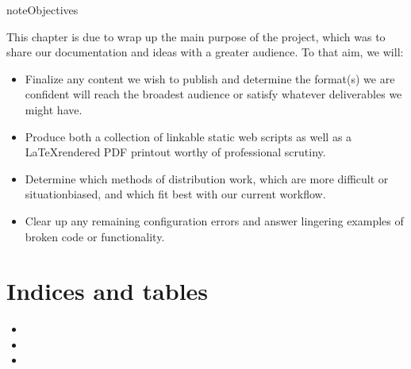 \documentclass[letterpaper,12pt,english]{sphinxmanual}
\begin{document}
\begin{sphinxadmonition}{note}{Objectives}

\sphinxAtStartPar
This chapter is due to wrap up the main purpose of the project, which was to share our documentation and ideas with a greater audience. To that aim, we will:
\begin{itemize}
\item {} 
\sphinxAtStartPar
Finalize any content we wish to publish and determine the format(s) we are confident will reach the broadest audience or satisfy whatever deliverables we might have.

\item {} 
\sphinxAtStartPar
Produce both a collection of linkable static web scripts as well as a LaTeX\sphinxhyphen{}rendered PDF printout worthy of professional scrutiny.

\item {} 
\sphinxAtStartPar
Determine which methods of distribution work, which are more difficult or situation\sphinxhyphen{}biased, and which fit best with our current workflow.

\item {} 
\sphinxAtStartPar
Clear up any remaining configuration errors and answer lingering examples of broken code or functionality.

\end{itemize}
\end{sphinxadmonition}


\chapter{Indices and tables}
\label{\detokenize{index:indices-and-tables}}\begin{itemize}
\item {} 
\sphinxAtStartPar
{}

\item {} 
\sphinxAtStartPar
{}

\item {} 
\sphinxAtStartPar
{}

\end{itemize}



\renewcommand{\indexname}{Index}
\printindex
\end{document}
